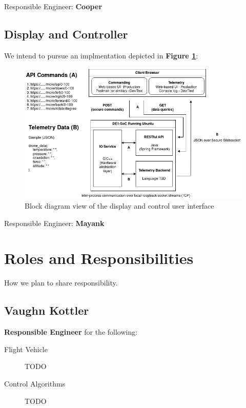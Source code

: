 \documentclass{article}
\begin{document}
{\large Responsible Engineer: \textbf{Cooper}}

\pagebreak

\subsection{Display and Controller}

We intend to pursue an implmentation depicted in
\textbf{Figure \ref{fig:display_controller}}:

\begin{figure}[H]
	\centering
	\includegraphics[width=\linewidth]{../src/im/display_controller}
	\caption{Block diagram view of the display and control user
		interface}
	\label{fig:display_controller}
\end{figure}

{\large Responsible Engineer: \textbf{Mayank}}

\section{Roles and Responsibilities}

How we plan to share responsibility.

\subsection{Vaughn Kottler}

\textbf{Responsible Engineer} for the following:

\begin{description}
	\item [Flight Vehicle] TODO
	\item [Control Algorithms] TODO
\end{description}
\end{document}
